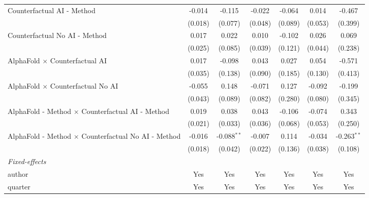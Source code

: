 \begin{tabular}{lcccccc}
   Counterfactual AI - Method                                 & -0.014       & -0.115        & -0.022       & -0.064  & 0.014       & -0.467\\   
                                                              & (0.018)      & (0.077)       & (0.048)      & (0.089) & (0.053)     & (0.399)\\   
   Counterfactual No AI - Method                              & 0.017        & 0.022         & 0.010        & -0.102  & 0.026       & 0.069\\   
                                                              & (0.025)      & (0.085)       & (0.039)      & (0.121) & (0.044)     & (0.238)\\   
   AlphaFold $\times$ Counterfactual AI                       & 0.017        & -0.098        & 0.043        & 0.027   & 0.054       & -0.571\\   
                                                              & (0.035)      & (0.138)       & (0.090)      & (0.185) & (0.130)     & (0.413)\\   
   AlphaFold $\times$ Counterfactual No AI                    & -0.055       & 0.148         & -0.071       & 0.127   & -0.092      & -0.199\\   
                                                              & (0.043)      & (0.089)       & (0.082)      & (0.280) & (0.080)     & (0.345)\\   
   AlphaFold - Method $\times$ Counterfactual AI - Method     & 0.019        & 0.038         & 0.043        & -0.106  & -0.074      & 0.343\\   
                                                              & (0.021)      & (0.033)       & (0.036)      & (0.068) & (0.053)     & (0.250)\\   
   AlphaFold - Method $\times$ Counterfactual No AI - Method  & -0.016       & -0.088$^{**}$ & -0.007       & 0.114   & -0.034      & -0.263$^{**}$\\   
                                                              & (0.018)      & (0.042)       & (0.022)      & (0.136) & (0.038)     & (0.108)\\   
   \midrule
   \emph{Fixed-effects}\\
   author                                                     & Yes          & Yes           & Yes          & Yes     & Yes         & Yes\\  
   quarter                                                    & Yes          & Yes           & Yes          & Yes     & Yes         & Yes\\  

\end{tabular}
